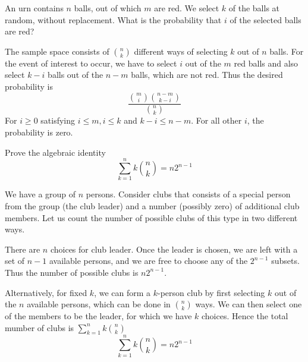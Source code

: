 \documentclass{tufte-handout}
\theoremstyle{definition} \newtheorem{definition}{Definition}
\theoremstyle{definition} \newtheorem{remark}{Remark}
\begin{document}
 \begin{example}
   An urn contains $n$ balls, out of which $m$ are red. We select $k$ of
   the balls at random, without replacement. What is the probability that
   $i$ of the selected balls are red?
 \end{example}

 \begin{solution}
   The sample space consists of $\binom{n}{k}$ different ways of
   selecting $k$ out of $n$ balls. For the event of interest to occur,
   we have to select $i$ out of the $m$ red balls and also select $k - i$
   balls out of the $n - m$ balls, which are not red. Thus the desired
   probability is
   \begin{equation*}
     \frac{\binom{m}{i} \binom{n - m}{k - i}}{\binom{n}{k}}
   \end{equation*}
   For $i \geq 0$ satisfying $i \leq m, i \leq k$ and $k - i \leq n - m$.
   For all other $i$, the probability is zero.
 \end{solution}

 \begin{example}
   Prove the algebraic identity
   \begin{equation*}
     \sum_{k = 1} ^n k \binom{n}{k} = n 2^{n - 1}
   \end{equation*}
   
 \end{example}
 \begin{solution}
   We have a group of $n$ persons. Consider clubs that consists of a
   special person from the group (the club leader) and a number (possibly
   zero) of additional club members. Let us count the number of possible
   clubs of this type in two different ways.

   There are $n$ choices for club leader. Once the leader is chosen, we
   are left with a set of $n - 1$ available persons, and we are free to
   choose any of the $2^{n - 1}$ subsets. Thus the number of possible
   clubs is $n 2^{n - 1}$.

   Alternatively, for fixed $k$, we can form a $k$-person club by first
   selecting $k$ out of the $n$ available persons, which can be done
   in $\binom{n}{k}$ ways. We can then select one of the members to
   be the leader, for which we have $k$ choices. Hence the total mumber
   of clubs is $\sum_{k = 1} ^n k \binom{n}{k}$
   \begin{equation*}
     \sum_{k = 1} ^n k \binom{n}{k} = n 2^{n - 1}
   \end{equation*}
 \end{solution}
\end{document}

